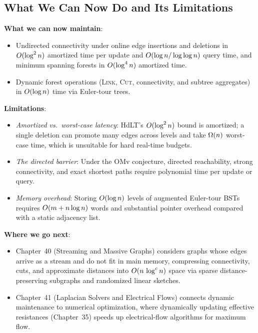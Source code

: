 \subsection{What We Can Now Do and Its Limitations}
\begin{connectionbox}
\textbf{What we can now maintain}:
\begin{itemize}
  \item Undirected connectivity under online edge insertions and deletions in
        $O(\log^2 n)$ amortized time per update and $O(\log n / \log\log n)$ query
        time, and minimum spanning forests in $O(\log^4 n)$ amortized time.
  \item Dynamic forest operations (\textsc{Link}, \textsc{Cut}, connectivity, and
        subtree aggregates) in $O(\log n)$ time via Euler-tour trees.
\end{itemize}

\textbf{Limitations}:
\begin{itemize}
  \item \emph{Amortized vs.\ worst-case latency}: HdLT's $O(\log^2 n)$ bound is
        amortized; a single deletion can promote many edges across levels and take
        $\Omega(n)$ worst-case time, which is unsuitable for hard real-time budgets.
  \item \emph{The directed barrier}: Under the $\mathrm{OMv}$ conjecture, directed
        reachability, strong connectivity, and exact shortest paths require polynomial
        time per update or query.
  \item \emph{Memory overhead}: Storing $O(\log n)$ levels of augmented Euler-tour
        BSTs requires $O(m + n\log n)$ words and substantial pointer overhead compared
        with a static adjacency list.
\end{itemize}

\textbf{Where we go next}:
\begin{itemize}
  \item Chapter~40 (Streaming and Massive Graphs) considers graphs whose edges arrive as
        a stream and do not fit in main memory, compressing connectivity, cuts, and
        approximate distances into $O(n\,\log^c n)$ space via sparse
        distance-preserving subgraphs and randomized linear sketches.
  \item Chapter~41 (Laplacian Solvers and Electrical Flows) connects dynamic maintenance
        to numerical optimization, where dynamically updating effective resistances
        (Chapter~35) speeds up electrical-flow algorithms for maximum flow.
\end{itemize}
\end{connectionbox}

